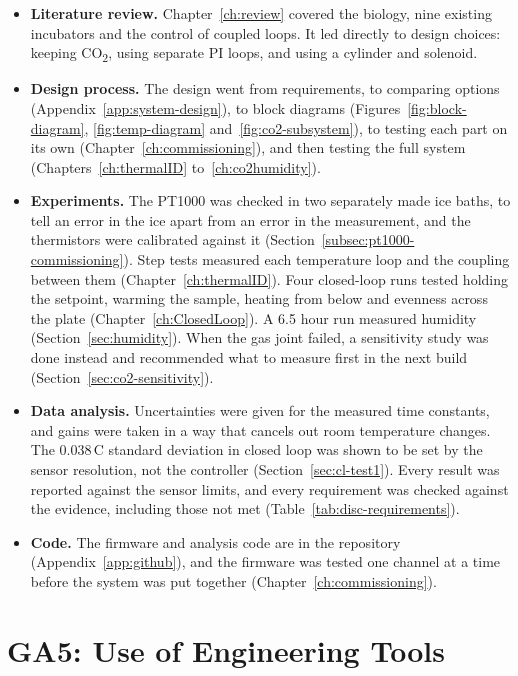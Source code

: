 \begin{itemize}[nosep]
    \item \textbf{Literature review.} Chapter~\ref{ch:review} covered the biology, nine existing incubators and the control of coupled loops. It led directly to design choices: keeping CO\textsubscript{2}, using separate PI loops, and using a cylinder and solenoid.
    \item \textbf{Design process.} The design went from requirements, to comparing options (Appendix~\ref{app:system-design}), to block diagrams (Figures~\ref{fig:block-diagram}, \ref{fig:temp-diagram} and~\ref{fig:co2-subsystem}), to testing each part on its own (Chapter~\ref{ch:commissioning}), and then testing the full system (Chapters~\ref{ch:thermalID} to~\ref{ch:co2humidity}).
    \item \textbf{Experiments.} The PT1000 was checked in two separately made ice baths, to tell an error in the ice apart from an error in the measurement, and the thermistors were calibrated against it (Section~\ref{subsec:pt1000-commissioning}). Step tests measured each temperature loop and the coupling between them (Chapter~\ref{ch:thermalID}). Four closed-loop runs tested holding the setpoint, warming the sample, heating from below and evenness across the plate (Chapter~\ref{ch:ClosedLoop}). A 6.5 hour run measured humidity (Section~\ref{sec:humidity}). When the gas joint failed, a sensitivity study was done instead and recommended what to measure first in the next build (Section~\ref{sec:co2-sensitivity}).
    \item \textbf{Data analysis.} Uncertainties were given for the measured time constants, and gains were taken in a way that cancels out room temperature changes. The 0.038\,\textdegree{}C standard deviation in closed loop was shown to be set by the sensor resolution, not the controller (Section~\ref{sec:cl-test1}). Every result was reported against the sensor limits, and every requirement was checked against the evidence, including those not met (Table~\ref{tab:disc-requirements}).
    \item \textbf{Code.} The firmware and analysis code are in the repository (Appendix~\ref{app:github}), and the firmware was tested one channel at a time before the system was put together (Chapter~\ref{ch:commissioning}).
\end{itemize}

\section{GA5: Use of Engineering Tools}
\label{app:ga5}

